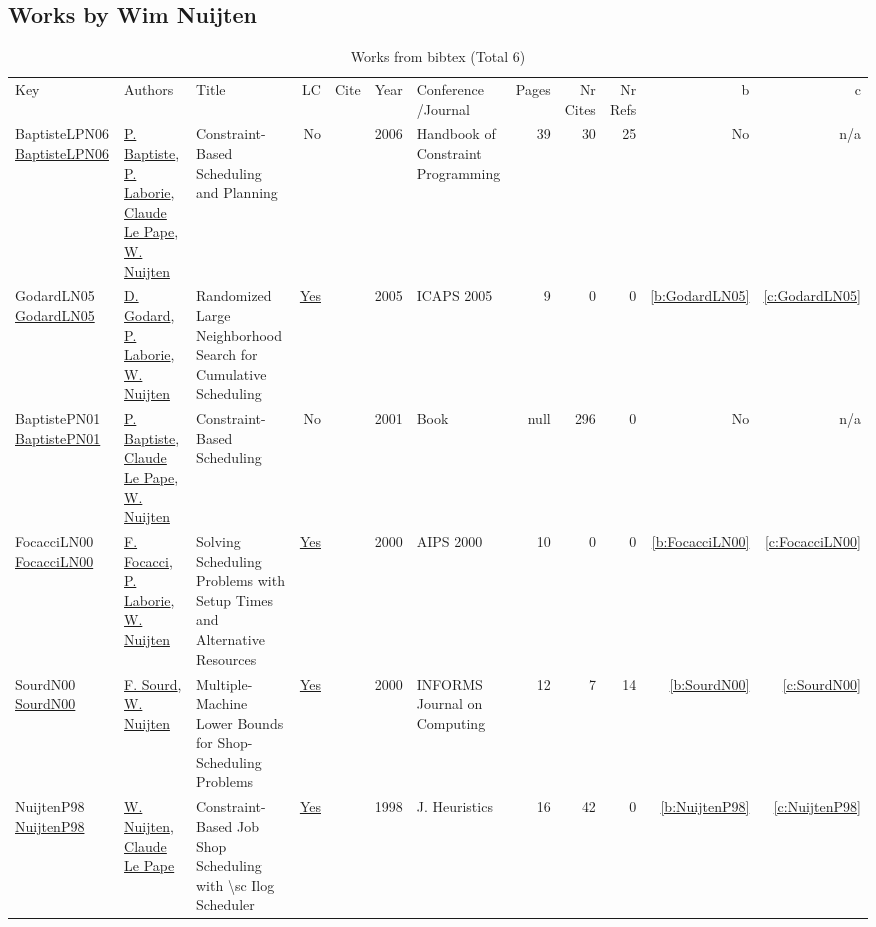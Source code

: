 \subsection{Works by Wim Nuijten}
\label{sec:a666}
{\scriptsize
\begin{longtable}{>{\raggedright\arraybackslash}p{3cm}>{\raggedright\arraybackslash}p{6cm}>{\raggedright\arraybackslash}p{6.5cm}rrrp{2.5cm}rrrrr}
\rowcolor{white}\caption{Works from bibtex (Total 6)}\\ \toprule
\rowcolor{white}Key & Authors & Title & LC & Cite & Year & \shortstack{Conference\\/Journal} & Pages & \shortstack{Nr\\Cites} & \shortstack{Nr\\Refs} & b & c \\ \midrule\endhead
\bottomrule
\endfoot
BaptisteLPN06 \href{https://doi.org/10.1016/S1574-6526(06)80026-X}{BaptisteLPN06} & \hyperref[auth:a164]{P. Baptiste}, \hyperref[auth:a118]{P. Laborie}, \hyperref[auth:a165]{Claude Le Pape}, \hyperref[auth:a666]{W. Nuijten} & Constraint-Based Scheduling and Planning & No & \cite{BaptisteLPN06} & 2006 & Handbook of Constraint Programming & 39 & 30 & 25 & No & n/a\\
GodardLN05 \href{http://www.aaai.org/Library/ICAPS/2005/icaps05-009.php}{GodardLN05} & \hyperref[auth:a783]{D. Godard}, \hyperref[auth:a118]{P. Laborie}, \hyperref[auth:a666]{W. Nuijten} & Randomized Large Neighborhood Search for Cumulative Scheduling & \href{works/GodardLN05.pdf}{Yes} & \cite{GodardLN05} & 2005 & ICAPS 2005 & 9 & 0 & 0 & \ref{b:GodardLN05} & \ref{c:GodardLN05}\\
BaptistePN01 \href{http://dx.doi.org/10.1007/978-1-4615-1479-4}{BaptistePN01} & \hyperref[auth:a164]{P. Baptiste}, \hyperref[auth:a165]{Claude Le Pape}, \hyperref[auth:a666]{W. Nuijten} & Constraint-Based Scheduling & No & \cite{BaptistePN01} & 2001 & Book & null & 296 & 0 & No & n/a\\
FocacciLN00 \href{http://www.aaai.org/Library/AIPS/2000/aips00-010.php}{FocacciLN00} & \hyperref[auth:a785]{F. Focacci}, \hyperref[auth:a118]{P. Laborie}, \hyperref[auth:a666]{W. Nuijten} & Solving Scheduling Problems with Setup Times and Alternative Resources & \href{works/FocacciLN00.pdf}{Yes} & \cite{FocacciLN00} & 2000 & AIPS 2000 & 10 & 0 & 0 & \ref{b:FocacciLN00} & \ref{c:FocacciLN00}\\
SourdN00 \href{https://doi.org/10.1287/ijoc.12.4.341.11881}{SourdN00} & \hyperref[auth:a784]{F. Sourd}, \hyperref[auth:a666]{W. Nuijten} & Multiple-Machine Lower Bounds for Shop-Scheduling Problems & \href{works/SourdN00.pdf}{Yes} & \cite{SourdN00} & 2000 & INFORMS Journal on Computing & 12 & 7 & 14 & \ref{b:SourdN00} & \ref{c:SourdN00}\\
NuijtenP98 \href{https://doi.org/10.1023/A:1009687210594}{NuijtenP98} & \hyperref[auth:a666]{W. Nuijten}, \hyperref[auth:a165]{Claude Le Pape} & Constraint-Based Job Shop Scheduling with {\textbackslash}sc Ilog Scheduler & \href{works/NuijtenP98.pdf}{Yes} & \cite{NuijtenP98} & 1998 & J. Heuristics & 16 & 42 & 0 & \ref{b:NuijtenP98} & \ref{c:NuijtenP98}\\
\end{longtable}
}


